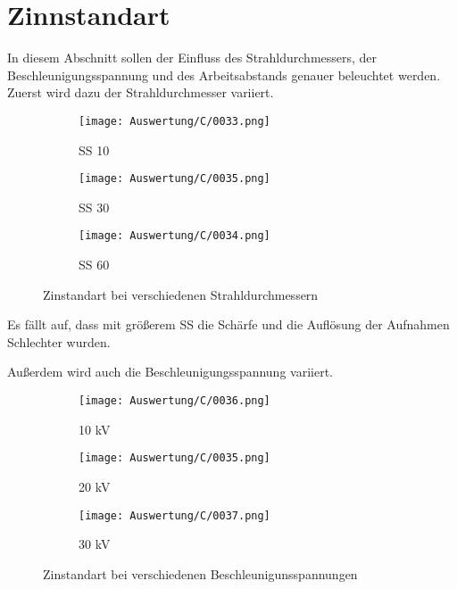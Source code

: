 \newpage
\section{Zinnstandart}
In diesem Abschnitt sollen der Einfluss des Strahldurchmessers, der Beschleunigungsspannung und des Arbeitsabstands genauer beleuchtet werden. \\

Zuerst wird dazu der Strahldurchmesser variiert.
\begin{figure}[h]
    \centering
    \begin{subfigure}[b]{0.25\textwidth}
        \centering
        \texttt{[image: Auswertung/C/0033.png]}
        \caption{SS 10}
    \end{subfigure}
    \hfill
    \begin{subfigure}[b]{0.25\textwidth}
        \centering
        \texttt{[image: Auswertung/C/0035.png]}
        \caption{SS 30}
    \end{subfigure}
    \hfill
    \begin{subfigure}[b]{0.25\textwidth}
        \centering
        \texttt{[image: Auswertung/C/0034.png]}
        \caption{SS 60}
    \end{subfigure}
    \caption{Zinstandart bei verschiedenen Strahldurchmessern}
\end{figure}

Es fällt auf, dass mit größerem SS die Schärfe und die Auflösung der Aufnahmen Schlechter wurden.

Außerdem wird auch die Beschleunigungsspannung variiert.
\begin{figure}[h]
    \centering
    \begin{subfigure}[b]{0.25\textwidth}
        \centering
        \texttt{[image: Auswertung/C/0036.png]}
        \caption{10 kV}
    \end{subfigure}
    \hfill
    \begin{subfigure}[b]{0.25\textwidth}
        \centering
        \texttt{[image: Auswertung/C/0035.png]}
        \caption{20 kV}
    \end{subfigure}
    \hfill
    \begin{subfigure}[b]{0.25\textwidth}
        \centering
        \texttt{[image: Auswertung/C/0037.png]}
        \caption{30 kV}
    \end{subfigure}
    \caption{Zinstandart bei verschiedenen Beschleunigunsspannungen}
\end{figure}

